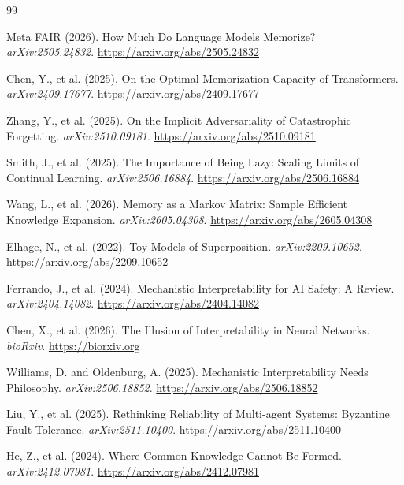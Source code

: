 \documentclass[11pt,letterpaper]{article}
\begin{document}

\begin{thebibliography}{99}

Meta FAIR (2026).
\newblock How Much Do Language Models Memorize?
\newblock \textit{arXiv:2505.24832}. \url{https://arxiv.org/abs/2505.24832}

Chen, Y., et al. (2025).
\newblock On the Optimal Memorization Capacity of Transformers.
\newblock \textit{arXiv:2409.17677}. \url{https://arxiv.org/abs/2409.17677}

Zhang, Y., et al. (2025).
\newblock On the Implicit Adversariality of Catastrophic Forgetting.
\newblock \textit{arXiv:2510.09181}. \url{https://arxiv.org/abs/2510.09181}

Smith, J., et al. (2025).
\newblock The Importance of Being Lazy: Scaling Limits of Continual Learning.
\newblock \textit{arXiv:2506.16884}. \url{https://arxiv.org/abs/2506.16884}

Wang, L., et al. (2026).
\newblock Memory as a Markov Matrix: Sample Efficient Knowledge Expansion.
\newblock \textit{arXiv:2605.04308}. \url{https://arxiv.org/abs/2605.04308}

Elhage, N., et al. (2022).
\newblock Toy Models of Superposition.
\newblock \textit{arXiv:2209.10652}. \url{https://arxiv.org/abs/2209.10652}

Ferrando, J., et al. (2024).
\newblock Mechanistic Interpretability for AI Safety: A Review.
\newblock \textit{arXiv:2404.14082}. \url{https://arxiv.org/abs/2404.14082}

Chen, X., et al. (2026).
\newblock The Illusion of Interpretability in Neural Networks.
\newblock \textit{bioRxiv}. \url{https://biorxiv.org}

Williams, D. and Oldenburg, A. (2025).
\newblock Mechanistic Interpretability Needs Philosophy.
\newblock \textit{arXiv:2506.18852}. \url{https://arxiv.org/abs/2506.18852}

Liu, Y., et al. (2025).
\newblock Rethinking Reliability of Multi-agent Systems: Byzantine Fault Tolerance.
\newblock \textit{arXiv:2511.10400}. \url{https://arxiv.org/abs/2511.10400}

He, Z., et al. (2024).
\newblock Where Common Knowledge Cannot Be Formed.
\newblock \textit{arXiv:2412.07981}. \url{https://arxiv.org/abs/2412.07981}


\end{thebibliography}
\end{document}
